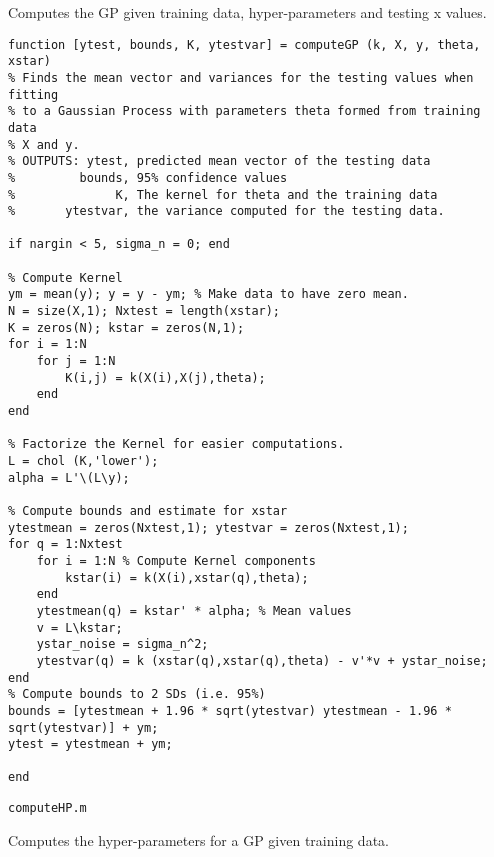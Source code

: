 \documentclass{article}
\begin{document}
Computes the GP given training data, hyper-parameters and testing x values.

\begin{lstlisting}
function [ytest, bounds, K, ytestvar] = computeGP (k, X, y, theta, xstar)
% Finds the mean vector and variances for the testing values when fitting
% to a Gaussian Process with parameters theta formed from training data
% X and y.
% OUTPUTS: ytest, predicted mean vector of the testing data
%         bounds, 95% confidence values
%              K, The kernel for theta and the training data
%       ytestvar, the variance computed for the testing data.

if nargin < 5, sigma_n = 0; end

% Compute Kernel
ym = mean(y); y = y - ym; % Make data to have zero mean.
N = size(X,1); Nxtest = length(xstar);
K = zeros(N); kstar = zeros(N,1);
for i = 1:N
    for j = 1:N
        K(i,j) = k(X(i),X(j),theta);
    end
end

% Factorize the Kernel for easier computations.
L = chol (K,'lower'); 
alpha = L'\(L\y);

% Compute bounds and estimate for xstar
ytestmean = zeros(Nxtest,1); ytestvar = zeros(Nxtest,1);
for q = 1:Nxtest
    for i = 1:N % Compute Kernel components
        kstar(i) = k(X(i),xstar(q),theta);
    end
    ytestmean(q) = kstar' * alpha; % Mean values
    v = L\kstar;
    ystar_noise = sigma_n^2;
    ytestvar(q) = k (xstar(q),xstar(q),theta) - v'*v + ystar_noise;
end
% Compute bounds to 2 SDs (i.e. 95%)
bounds = [ytestmean + 1.96 * sqrt(ytestvar) ytestmean - 1.96 * sqrt(ytestvar)] + ym;
ytest = ytestmean + ym;

end
\end{lstlisting}


\texttt{computeHP.m}

Computes the hyper-parameters for a GP given training data.
\end{document}
